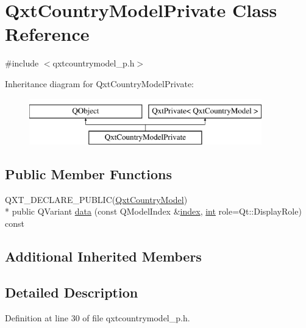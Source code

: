 \hypertarget{class_qxt_country_model_private}{\section{Qxt\-Country\-Model\-Private Class Reference}
\label{class_qxt_country_model_private}
}


{\ttfamily \#include $<$qxtcountrymodel\-\_\-p.\-h$>$}

Inheritance diagram for Qxt\-Country\-Model\-Private\-:\begin{figure}[H]
\begin{center}
\leavevmode
\includegraphics[height=2.000000cm]{class_qxt_country_model_private}
\end{center}
\end{figure}
\subsection*{Public Member Functions}
\begin{DoxyCompactItemize}
\item 
Q\-X\-T\-\_\-\-D\-E\-C\-L\-A\-R\-E\-\_\-\-P\-U\-B\-L\-I\-C(\hyperlink{class_qxt_country_model}{Qxt\-Country\-Model}) \\*
public Q\-Variant \hyperlink{class_qxt_country_model_private_ae7c0b13e34fb1bdce1c633a0b110714a}{data} (const Q\-Model\-Index \&\hyperlink{glext_8h_ab47dd9958bcadea08866b42bf358e95e}{index}, \hyperlink{ioapi_8h_a787fa3cf048117ba7123753c1e74fcd6}{int} role=Qt\-::\-Display\-Role) const 
\end{DoxyCompactItemize}
\subsection*{Additional Inherited Members}


\subsection{Detailed Description}


Definition at line 30 of file qxtcountrymodel\-\_\-p.\-h.




